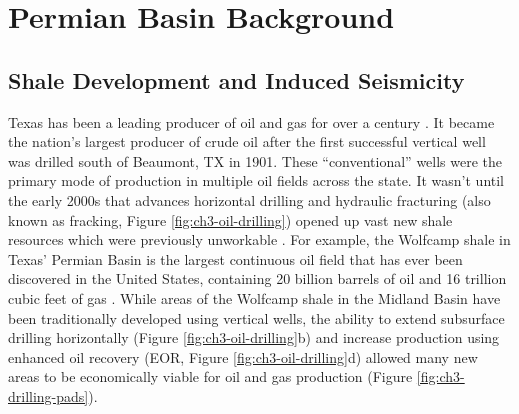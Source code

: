 
\chapter{ Permian Basin Background}
\label{CHAP:3}





\section{Shale Development and Induced Seismicity}
\label{sec:ch3-oil}

Texas has been a leading producer of oil and gas for over a century \citep{Frohlich2016HistoricalReviewInduced, TheAcademyofMedicine2017EnvironmentalCommunityImpacts}. It became the nation's largest producer of crude oil after the first successful vertical well was drilled south of Beaumont, TX in 1901. These ``conventional'' wells were the primary mode of production in multiple oil fields across the state. It wasn't until the early 2000s that advances horizontal drilling and hydraulic fracturing (also known as fracking, Figure \ref{fig:ch3-oil-drilling}) opened up vast new shale resources which were previously unworkable \citep{Waters2006Spe103202Ms}. 
For example, the Wolfcamp shale in Texas' Permian Basin is the largest continuous oil field that has ever been discovered in the United States, containing 20 billion barrels of oil and 16 trillion cubic feet of gas \citep{Gaswirth2016AssessmentUndiscoveredContinuous}. While areas of the Wolfcamp shale in the Midland Basin have been traditionally developed using vertical wells, the ability to extend subsurface drilling horizontally (Figure \ref{fig:ch3-oil-drilling}b) and increase production using enhanced oil recovery (EOR, Figure \ref{fig:ch3-oil-drilling}d)
allowed many new areas to be economically viable for oil and gas production (Figure \ref{fig:ch3-drilling-pads}).




